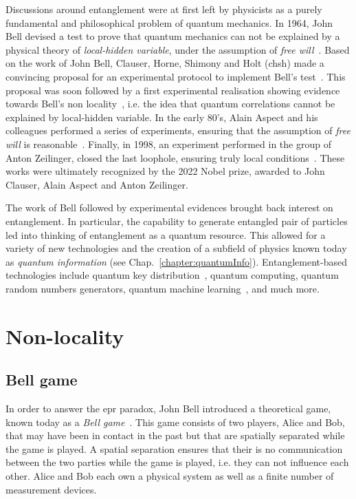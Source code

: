 \medbreak
Discussions around entanglement were at first left by physicists as a purely fundamental and philosophical problem of quantum mechanics.
In 1964, John Bell devised a test to prove that quantum mechanics can not be explained by a physical theory of \textit{local-hidden variable}, under the assumption of \textit{free will}~\cite{Bell1964}. 
Based on the work of John Bell, Clauser, Horne, Shimony and Holt (\acrshort{chsh}) made a convincing proposal for an experimental protocol to implement Bell's test~\cite{Clauser1969}. 
This proposal was soon followed by a first experimental realisation showing evidence towards Bell's non locality~\cite{Freedman1972}, i.e. the idea that quantum correlations cannot be explained by local-hidden variable.
In the early 80's, Alain Aspect and his colleagues performed a series of experiments, ensuring that the assumption of \textit{free will} is reasonable~\cite{Aspect1982}.
Finally, in 1998, an experiment performed in the group of Anton Zeilinger, closed the last loophole, ensuring truly local conditions~\cite{Weihs1998}.
These works were ultimately recognized by the 2022 Nobel prize, awarded to John Clauser, Alain Aspect and Anton Zeilinger.

\medbreak
The work of Bell followed by experimental evidences brought back interest on entanglement.
In particular, the capability to generate entangled pair of particles led into thinking of entanglement as a quantum resource.
This allowed for a variety of new technologies and the creation of a subfield of physics known today as \textit{quantum information} (see Chap.~\ref{chapter:quantumInfo}).
Entanglement-based technologies include quantum key distribution~\cite{Ekert1991}, quantum computing, quantum random numbers generators, quantum machine learning~\cite{Biamonte2017}, and much more. 


\chapter{Non-locality}
\label{section:nonlocality}


\section{Bell game}

In order to answer the \acrshort{epr} paradox, John Bell introduced a theoretical game, known today as a \textit{Bell game}~\cite{Bell1964}.
This game consists of two players, Alice and Bob, that may have been in contact in the past but that are spatially separated while the game is played.
A spatial separation ensures that their is no communication between the two parties while the game is played, i.e. they can not influence each other.
Alice and Bob each own a physical system as well as a finite number of measurement devices.

